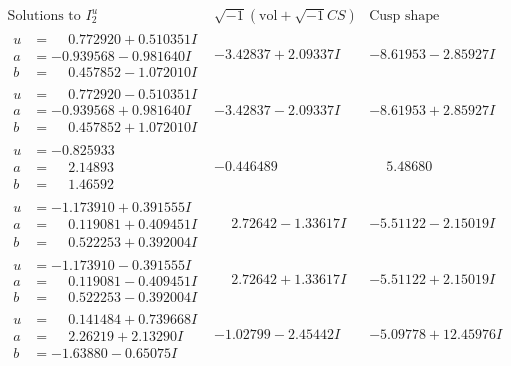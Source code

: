 \documentclass[1p]{elsarticle_modified}
\theoremstyle{definition}
\newcommand{\I}{\sqrt{-1}}
\begin{document}
$$\begin{array}{c|c|c}  
\text{Solutions to }I^u_{2}& \I (\text{vol} + \sqrt{-1}CS) & \text{Cusp shape}\\
 \hline 
\begin{aligned}
u &= \phantom{-}0.772920 + 0.510351 I \\
a &= -0.939568 - 0.981640 I \\
b &= \phantom{-}0.457852 - 1.072010 I\end{aligned}
 & -3.42837 + 2.09337 I & -8.61953 - 2.85927 I \\ \hline\begin{aligned}
u &= \phantom{-}0.772920 - 0.510351 I \\
a &= -0.939568 + 0.981640 I \\
b &= \phantom{-}0.457852 + 1.072010 I\end{aligned}
 & -3.42837 - 2.09337 I & -8.61953 + 2.85927 I \\ \hline\begin{aligned}
u &= -0.825933\phantom{ +0.000000I} \\
a &= \phantom{-}2.14893\phantom{ +0.000000I} \\
b &= \phantom{-}1.46592\phantom{ +0.000000I}\end{aligned}
 & -0.446489\phantom{ +0.000000I} & \phantom{-}5.48680\phantom{ +0.000000I} \\ \hline\begin{aligned}
u &= -1.173910 + 0.391555 I \\
a &= \phantom{-}0.119081 + 0.409451 I \\
b &= \phantom{-}0.522253 + 0.392004 I\end{aligned}
 & \phantom{-}2.72642 - 1.33617 I & -5.51122 - 2.15019 I \\ \hline\begin{aligned}
u &= -1.173910 - 0.391555 I \\
a &= \phantom{-}0.119081 - 0.409451 I \\
b &= \phantom{-}0.522253 - 0.392004 I\end{aligned}
 & \phantom{-}2.72642 + 1.33617 I & -5.51122 + 2.15019 I \\ \hline\begin{aligned}
u &= \phantom{-}0.141484 + 0.739668 I \\
a &= \phantom{-}2.26219 + 2.13290 I \\
b &= -1.63880 - 0.65075 I\end{aligned}
 & -1.02799 - 2.45442 I & -5.09778 + 12.45976 I \\ \hline\begin{aligned}

\end{aligned}
\end{array}$$
\end{document}
